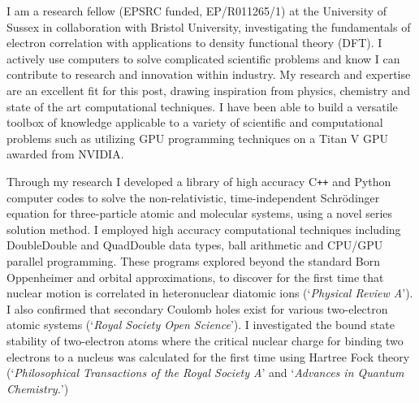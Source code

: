 \documentclass[a4paper]{awesome-cv} %
\begin{document}
\makecvheader %

\makelettertitle %

\vspace{-0.3cm}
\begin{cvletter}

I am a research fellow (EPSRC funded, EP/R011265/1) at the University of Sussex in collaboration with Bristol University, investigating the fundamentals of electron correlation with applications to density functional theory (DFT). I actively use computers to solve complicated scientific problems and know I can contribute to research and innovation within industry. My research and expertise are an excellent fit for this post, drawing inspiration from physics, chemistry and state of the art computational techniques. I have been able to build a versatile toolbox of knowledge applicable to a variety of scientific and computational problems such as utilizing GPU programming techniques on a Titan V GPU awarded from NVIDIA.


Through my research I developed a library of high accuracy C\texttt{++} and Python computer codes to solve the non-relativistic, time-independent Schr\"{o}dinger equation for three-particle atomic and molecular systems, using a novel series solution method. I employed high accuracy computational techniques including DoubleDouble and QuadDouble data types, ball arithmetic and CPU/GPU parallel programming. These programs explored beyond the standard Born Oppenheimer and orbital approximations, to discover for the first time that nuclear motion is correlated in heteronuclear diatomic ions (`\textit{Physical Review A}'). I also confirmed that secondary Coulomb holes exist for various two-electron atomic systems (`\textit{Royal Society Open Science}'). I investigated the bound state stability of two-electron atoms where the critical nuclear charge for binding two electrons to a nucleus was calculated for the first time using Hartree Fock theory (`\textit{Philosophical Transactions of the Royal Society A}' and `\textit{Advances in Quantum Chemistry.}')



\end{cvletter}
\end{document}
